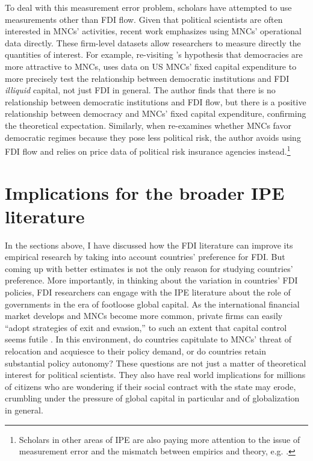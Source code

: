 To deal with this measurement error problem, scholars have attempted to use
measurements other than FDI flow. Given that political scientists are often
interested in MNCs' activities, recent work emphasizes using MNCs' operational
data directly. These firm-level datasets allow researchers to measure directly
the quantities of interest. For example, re-visiting \citet{Li2009a}'s
hypothesis that democracies are more attractive to MNCs, \citet{Kerner2014} uses
data on US MNCs' fixed capital expenditure to more precisely test the
relationship between democratic institutions and FDI \textit{illiquid} capital,
not just FDI in general. The author finds that there is no relationship between
democratic institutions and FDI flow, but there is a positive relationship
between democracy and MNCs' fixed capital expenditure, confirming the
theoretical expectation. Similarly, when \citet{Jensen2008a} re-examines whether
MNCs favor democratic regimes because they pose less political risk, the author
avoids using FDI flow and relies on price data of political risk insurance
agencies instead.\footnote{Scholars in other areas of IPE are also paying more
  attention to the issue of measurement error and the mismatch between empirics
  and theory, e.g. \citet{Karcher2013}.}

\section{Implications for the broader IPE literature}

In the sections above, I have discussed how the FDI literature can improve its
empirical research by taking into account countries' preference for FDI. But
coming up with better estimates is not the only reason for studying countries'
preference. More importantly, in thinking about the variation in countries' FDI
policies, FDI researchers can engage with the IPE literature
about the role of governments in the era of footloose global capital. As the
international financial market develops and MNCs become more common, private
firms can easily ``adopt strategies of exit and evasion,'' to such an extent
that capital control seems futile \citep{Goodman1993}. In this environment, do
countries capitulate to MNCs' threat of relocation and acquiesce to their policy
demand, or do countries retain substantial policy autonomy? These questions are
not just a matter of theoretical interest for political scientists. They also
have real world implications for millions of citizens who are wondering if their
social contract with the state may erode, crumbling under the pressure of global
capital in particular and of globalization in general.


